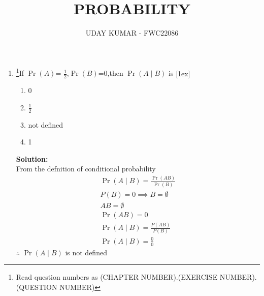 \documentclass{article}
\providecommand{\pr}[1]{\ensuremath{\Pr\left(#1\right)}}
\newcommand{\solution}{\noindent \textbf{Solution: }}
\begin{document}
\title{PROBABILITY}
\author{\Large UDAY KUMAR - FWC22086}
\date{}

\maketitle

\begin{enumerate}[label=13.\arabic{enumi}.\arabic{enumii}]%
\setcounter{enumi}{0}
\setcounter{enumii}{6}

\item \footnote{Read question numbers as (CHAPTER NUMBER).(EXERCISE NUMBER).(QUESTION NUMBER)}{If \pr{A}= $\frac{1}{2}$,\pr{B}=0,then \pr{A \mid B} is }[1ex]
\begin{enumerate}
\item 0
\item $\frac{1}{2}$
\item not defined
\item 1
\end{enumerate}
	\solution\\
		From the defnition of conditional probability\\
\begin{align}
&\pr{A \mid B} = \frac{\pr{A B}}{\pr{B}}&\\
& P(B) = 0 \implies  B = \emptyset&\\
&AB = \emptyset&\\
&\pr{A B} =0&\\
&\pr{A \mid B} = \frac{P(AB)}{P(B)}&\\
&\pr{A \mid B} = \frac{0}{0}&
\end{align}
$\therefore$ \pr{A \mid B} is not defined
\end{enumerate}
\end{document}
